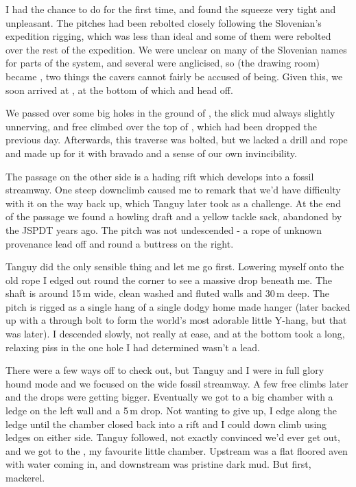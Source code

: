 I had the chance to do  for the first time, and found the squeeze very tight and unpleasant. The pitches had been rebolted closely following the Slovenian's expedition rigging, which was less than ideal and some of them were rebolted over the rest of the expedition. We were unclear on many of the Slovenian names for parts of the system, and several were anglicised, so  (the drawing room) became , two things the  cavers cannot fairly be accused of being. Given this, we soon arrived at , at the bottom of which  and  head off.
 
We passed over some big holes in the ground of , the slick mud always slightly unnerving, and free climbed over the top of , which had been dropped the previous day. Afterwards, this traverse was bolted, but we lacked a drill and rope and made up for it with bravado and a sense of our own invincibility.
 
The passage on the other side is a hading rift which develops into a fossil streamway. One steep downclimb caused me to remark that we'd have difficulty with it on the way back up, which Tanguy later took as a challenge. At the end of the passage we found a howling draft and a yellow tackle sack, abandoned by the JSPDT years ago. The pitch was not undescended -  a rope of unknown provenance lead off and round a buttress on the right.
 
Tanguy did the only sensible thing and let me go first. Lowering myself onto the old rope I edged out round the corner to see a massive drop beneath me. The shaft is around 15\,m wide, clean washed and fluted walls and 30\,m deep. The pitch is rigged as a single hang of a single dodgy home made hanger (later backed up with a through bolt to form the world's most adorable little Y-hang, but that was later). I descended slowly, not really at ease, and at the bottom took a long, relaxing piss in the one hole I had determined wasn't a lead.
 
There were a few ways off to check out, but Tanguy and I were in full glory hound mode and we focused on the wide fossil streamway. A few free climbs later and the drops were getting bigger. Eventually we got to a big chamber with a ledge on the left wall and a 5\,m drop. Not wanting to give up, I edge along the ledge until the chamber closed back into a rift and I could down climb using ledges on either side. Tanguy followed, not exactly convinced we'd ever get out, and we got to the , my favourite little chamber. Upstream was a flat floored aven with water coming in, and downstream was pristine dark mud. But first, mackerel.
 
